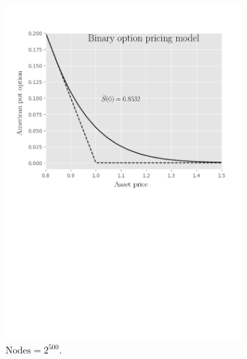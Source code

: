 \begin{figure}[tbp]
  \centering
  \begin{subfigure}{0.4\textwidth}
    \centering
    \includegraphics[width=\textwidth]{chapters/chapter3/TestCase3BOPM.pdf}
    \caption{$\text{Nodes} = 2^{500}$.}
    \label{fig:finitedifferencesschemes:numericaresults:test_case_4_bopm}
  \end{subfigure}
  \hspace{0.5cm}
  \begin{subfigure}{0.4\textwidth}
    \centering

\end{subfigure}
\end{figure}

